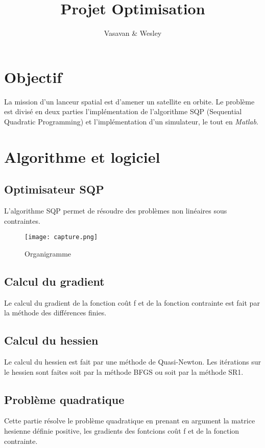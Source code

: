 \documentclass[a4paper,20pt]{article}
\title{Projet Optimisation}
\author{Vasavan \& Wesley}
\begin{document}
\maketitle
\newpage
\protect\hypertarget{table}{}
\renewcommand{\contentsname}{Sommaire}
\tableofcontents
\newpage
\newpage

\section{Objectif}
La mission d'un lanceur spatial est d'amener un satellite en orbite. Le
 probl\`eme est divis\'e en deux parties l'impl\'ementation de l'algorithme SQP
 (Sequential Quadratic Programming) et l'impl\'ementation d'un simulateur, le
 tout en \textit{Matlab}.
\newpage

\section{Algorithme et logiciel}
\subsection{Optimisateur SQP}
L'algorithme SQP permet de r\'esoudre des probl\`emes non lin\'eaires sous
 contraintes.

\begin{figure}[h!]
\centering
\texttt{[image: capture.png]}
\caption{Organigramme}
\label{fig:1}
\end{figure}

\subsection{Calcul du gradient}
Le calcul du gradient de la fonction co\^ut f et de
la fonction contrainte est fait par la méthode des diff\'erences finies.

\subsection{Calcul du hessien}
Le calcul du hessien est fait par une m\'ethode de Quasi-Newton. Les
 it\'erations sur le hessien sont faites soit par la méthode BFGS ou soit par la
 méthode SR1.

\subsection{Probl\`eme quadratique}
Cette partie r\'esolve le probl\`eme quadratique en prenant en argument la
 matrice hesienne d\'efinie positive, les gradients des fontcions co\^ut f et de
 la fonction contrainte.
\end{document}
